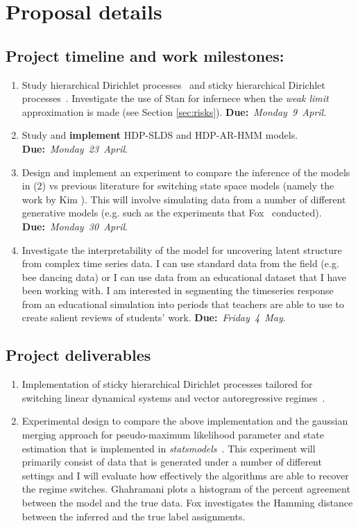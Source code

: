 \documentclass[twoside]{article}
\begin{document}
\section{Proposal details}
\subsection{Project timeline and work milestones:}
\begin{enumerate}
  \item Study hierarchical Dirichlet processes~\cite{teh2005sharing} and sticky hierarchical Dirichlet processes~\cite{fox2008hdp}. Investigate the use of Stan for infernece when the \textit{weak limit} approximation is made (see Section \ref{sec:risks}). \textbf{Due:}~\textit{Monday~9~April}.
  \item Study and \textbf{implement} HDP-SLDS and HDP-AR-HMM models\cite{fox2011bayesian}. \textbf{Due:}~\textit{Monday~23~April}.
  \item Design and implement an experiment to compare the inference of the models in (2) vs previous literature for switching state space models (namely the work by Kim \cite{kim1999state}). This will involve simulating data from a number of different generative models (e.g. such as the experiments that Fox~\cite{fox2011bayesian} conducted). \textbf{Due:}~\textit{Monday~30~April}.
  \item Investigate the interpretability of the model for uncovering latent structure from complex time series data. I can use standard data from the field (e.g. bee dancing data) or I can use data from an educational dataset that I have been working with. I am interested in segmenting the timeseries response from an educational simulation into periods that teachers are able to use to create salient reviews of students' work. \textbf{Due:}~\textit{Friday~4~May}.
\end{enumerate}

\subsection{Project deliverables}
\begin{enumerate}
  \item Implementation of sticky hierarchical Dirichlet processes tailored for switching linear dynamical systems and vector autoregressive regimes~\cite{fox2011bayesian}.
  \item Experimental design to compare the above implementation and the gaussian merging approach for pseudo-maximum likelihood parameter and state estimation that is implemented in \textit{statsmodels}~\cite{kim1999state}. This experiment will primarily consist of data that is generated under a number of different settings and I will evaluate how effectively the algorithms are able to recover the regime switches. Ghahramani plots a histogram of the percent agreement between the model and the true data. Fox investigates the Hamming distance between the inferred and the true label assignments.
\end{enumerate}
\end{document}
